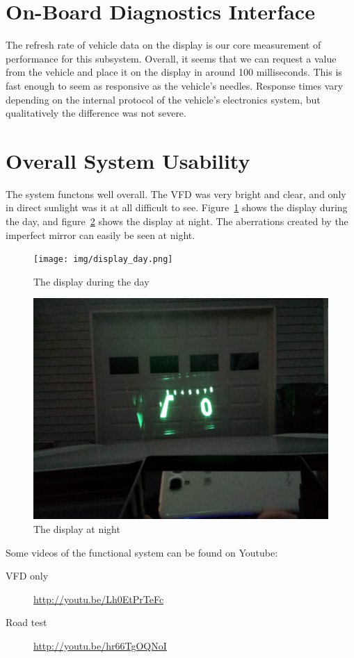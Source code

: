 \section{On-Board Diagnostics Interface}

The refresh rate of vehicle data on the display is our core measurement of
performance for this subsystem. Overall, it seems that we can request a value
from the vehicle and place it on the display in around 100 milliseconds. This
is fast enough to seem as responsive as the vehicle's needles. Response times
vary depending on the internal protocol of the vehicle's electronics system, but
qualitatively the difference was not severe.

\section{Overall System Usability}

The system functons well overall. The VFD was very bright and clear, and only
in direct sunlight was it at all difficult to see. Figure~\ref{fig:display-day}
shows the display during the day, and figure~\ref{fig:display-night} shows
the display at night.  The aberrations created by the imperfect mirror can 
easily be seen at night.

\begin{figure}[h]
\texttt{[image: img/display\_day.png]}
\caption{The display during the day}
\label{fig:display-day}
\end{figure}

\begin{figure}[h]
\includegraphics[width=\textwidth]{img/display_night.jpg}
\caption{The display at night}
\label{fig:display-night}
\end{figure}

Some videos of the functional system can be found on Youtube:

\begin{description}
\item[VFD only]\url{http://youtu.be/Lh0EtPrTeFc}
\item[Road test] \url{http://youtu.be/hr66TgOQNoI}
\end{description}
